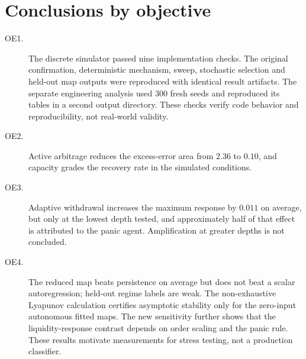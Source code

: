 \section{Conclusions by objective}

\begin{description}
  \item[OE1.] The discrete simulator passed nine implementation checks. The original confirmation, deterministic mechanism, sweep, stochastic selection and held-out map outputs were reproduced with identical result artifacts. The separate engineering analysis used 300 fresh seeds and reproduced its tables in a second output directory. These checks verify code behavior and reproducibility, not real-world validity.
  \item[OE2.] Active arbitrage reduces the excess-error area from $2.36$ to $0.10$, and capacity grades the recovery rate in the simulated conditions.
  \item[OE3.] Adaptive withdrawal increases the maximum response by $0.011$ on average, but only at the lowest depth tested, and approximately half of that effect is attributed to the panic agent. Amplification at greater depths is not concluded.
  \item[OE4.] The reduced map beats persistence on average but does not beat a scalar autoregression; held-out regime labels are weak. The non-exhaustive Lyapunov calculation certifies asymptotic stability only for the zero-input autonomous fitted maps. The new sensitivity further shows that the liquidity-response contrast depends on order scaling and the panic rule. These results motivate measurements for stress testing, not a production classifier.
\end{description}

